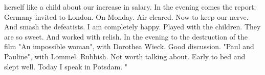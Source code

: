 herself like a child about our increase in salary. In the evening comes the report: Germany invited to London. On Monday. Air cleared. Now to keep our nerve. And smash the defeatists. I am completely happy. Played with the children. They are so sweet. And worked with relish. In the evening to the destruction of the film "An impossible woman", with Dorothea Wieck. Good discussion. "Paul and Pauline", with Lommel. Rubbish. Not worth talking about. Early to bed and slept well. Today I speak in Potsdam.
"

